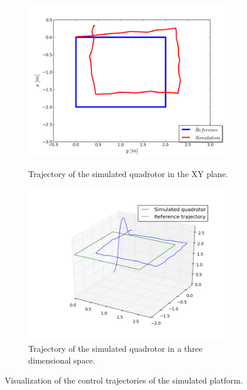 \begin{figure}[H]
        \centering
        \begin{subfigure}[b]{0.5\textwidth}
            \includegraphics[width=\textwidth]{Images/Chapter5/ardrone/T2/2Dtrajectory.png}   \qquad   
            \caption{Trajectory of the simulated quadrotor in the XY plane.}
            \label{fig:ardrone_sq_2D}  
            \includegraphics[width=\textwidth]{Images/Chapter5/ardrone/T2/3Dtrajectory.png}
            \caption{Trajectory of the simulated quadrotor in a three dimensional space.}
            \label{fig:ardrone_sq_3D}
        \end{subfigure}
\caption{Visualization of the control trajectories of the simulated platform.}
\label{fig:ardrone_sq_trajectory}
\end{figure}

